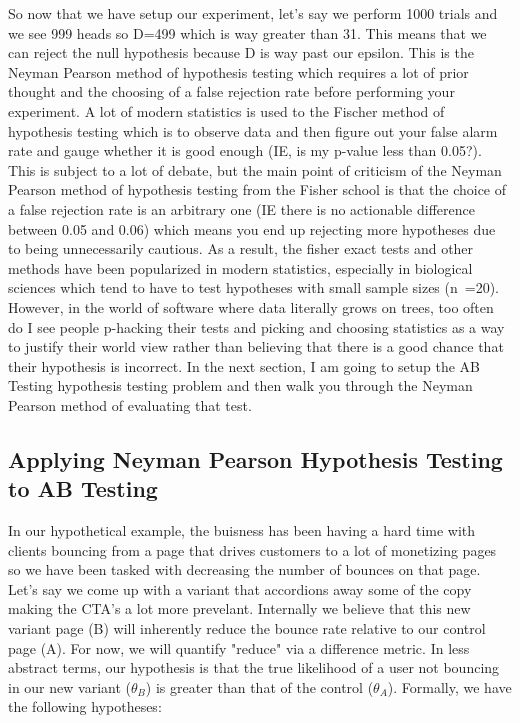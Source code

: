 So now that we have setup our experiment, let’s say we perform 1000 trials 
and we see 999 heads so D=499 which is way greater than 31. This means that we can reject the null hypothesis because D is way past our epsilon. 
This is the Neyman Pearson method of hypothesis testing which requires a lot of prior thought and the choosing of a false rejection rate 
before performing your experiment. A lot of modern statistics is used to the Fischer method of hypothesis testing which is to observe data 
and then figure out your false alarm rate and gauge whether it is good enough (IE, is my p-value less than 0.05?). 
This is subject to a lot of debate, but the main point of criticism of the Neyman Pearson method of hypothesis testing from the Fisher school 
is that the choice of a false rejection rate is an arbitrary one (IE there is no actionable difference between 0.05 and 0.06) which means you 
end up rejecting more hypotheses due to being unnecessarily cautious. As a result, the fisher exact tests and other methods have been 
popularized in modern statistics, especially in biological sciences which tend to have to test hypotheses with small sample sizes (n~=20). 
However, in the world of software where data literally grows on trees, too often do I see people p-hacking their tests and picking and choosing 
statistics as a way to justify their world view rather than believing that there is a good chance that their hypothesis is incorrect. 
In the next section, I am going to setup the AB Testing hypothesis testing problem and then walk you through the Neyman Pearson method 
of evaluating that test.

\subsection{Applying Neyman Pearson Hypothesis Testing to AB Testing}

In our hypothetical example, the buisness has been having a hard time with clients bouncing from a page
that drives customers to a lot of monetizing pages so we have been tasked with decreasing 
the number of bounces on that page. Let's say we come up with a variant that accordions away some of the copy
making the CTA's a lot more prevelant. Internally we believe that this new variant page (B) will inherently reduce the
bounce rate relative to our control page (A). For now, we will quantify "reduce" via a difference metric. In less abstract
terms, our hypothesis is that the true likelihood of a user not bouncing in our new variant ($\theta_B$)
is greater than that of the control ($\theta_A$). Formally, we have the following hypotheses:

